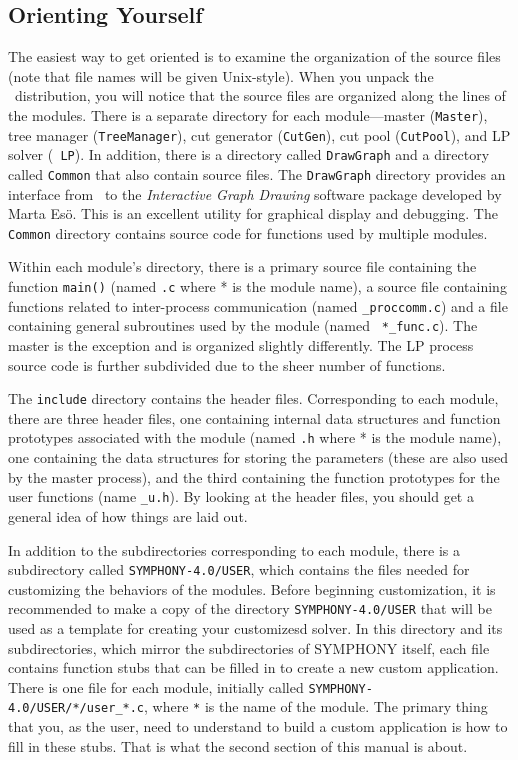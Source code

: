 \subsection{Orienting Yourself}

The easiest way to get oriented is to examine the organization of the source
files (note that file names will be given Unix-style). When you unpack the
\BB\ distribution, you will notice that the source files are organized along
the lines of the modules.  There is a separate directory for each
module---master ({\tt Master}), tree manager ({\tt TreeManager}), cut
generator ({\tt CutGen}), cut pool ({\tt CutPool}), and LP solver ({\tt
LP}). In addition, there is a directory called {\tt DrawGraph} and a directory
called {\tt Common} that also contain source files. The {\tt DrawGraph}
directory provides an interface from \BB\ to the {\em Interactive Graph
Drawing} software package developed by Marta Es\"o. This is an excellent
utility for graphical display and debugging. The {\tt Common} directory
contains source code for functions used by multiple modules.

Within each module's directory, there is a primary source file
containing the function {\tt main()} (named {\tt *.c} where * is the
module name), a source file containing functions related to
inter-process communication (named {\tt *\_proccomm.c}) and a file
containing general subroutines used by the module (named {\tt
*\_func.c}). The master is the exception and is organized slightly
differently. The LP process source code is further subdivided due to
the sheer number of functions.

The {\tt include} directory contains the header files. Corresponding
to each module, there are three header files, one containing internal
data structures and function prototypes associated with the module
(named {\tt *.h} where * is the module name), one containing the data
structures for storing the parameters (these are also used by the
master process), and the third containing the function prototypes for
the user functions (name {\tt *\_u.h}). By looking at the header files, you
should get a general idea of how things are laid out.

In addition to the subdirectories corresponding to each module, there is a
subdirectory called \texttt{SYMPHONY-4.0/USER}, which contains the files
needed for customizing the behaviors of the modules. Before beginning
customization, it is recommended to make a copy of the directory
\texttt{SYMPHONY-4.0/USER} that will be used as a template for creating your
customizesd solver. In this directory and its subdirectories, which mirror the
subdirectories of SYMPHONY itself, each file contains function stubs that can
be filled in to create a new custom application. There is one file for each
module, initially called \texttt{SYMPHONY-4.0/USER/*/user\_*.c}, where
\texttt{*} is the name of the module. The primary thing that you, as the user,
need to understand to build a custom application is how to fill in these
stubs. That is what the second section of this manual is about.

